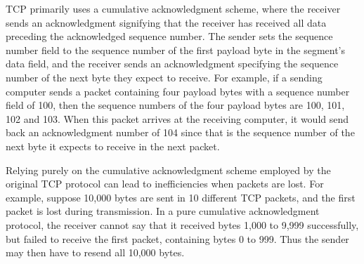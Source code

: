    TCP primarily uses a
  cumulative acknowledgment scheme, where the receiver sends an acknowledgment signifying
  that the receiver has received all data preceding the acknowledged sequence number. The
  sender sets the sequence number field to the sequence number of the first payload byte
  in the segment's data field, and the receiver sends an acknowledgment specifying the
  sequence number of the next byte they expect to receive. For example, if a sending
  computer sends a packet containing four payload bytes with a sequence number field of
  100, then the sequence numbers of the four payload bytes are 100, 101, 102 and 103. When
  this packet arrives at the receiving computer, it would send back an acknowledgment
  number of 104 since that is the sequence number of the next byte it expects to receive
  in the next packet.

  Relying purely on the cumulative acknowledgment scheme employed by the original TCP
  protocol can lead to inefficiencies when packets are lost. For example, suppose 10,000
  bytes are sent in 10 different TCP packets, and the first packet is lost during
  transmission. In a pure cumulative acknowledgment protocol, the receiver cannot say that
  it received bytes 1,000 to 9,999 successfully, but failed to receive the first packet,
  containing bytes 0 to 999. Thus the sender may then have to resend all 10,000
  bytes. 


